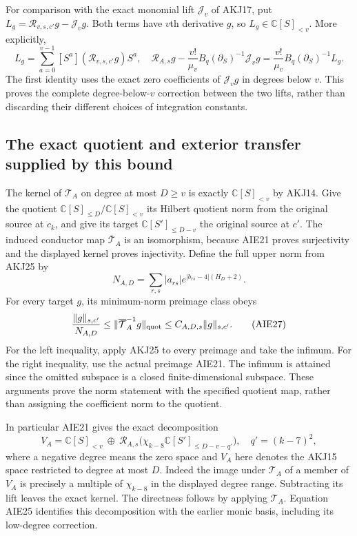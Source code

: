 \documentclass[11pt,a4paper]{article}
\begin{document}
For comparison with the exact monomial lift $\mathcal J_v$ of AKJ17,
put
$L_g=\mathcal R_{v,s,c'}g-\mathcal J_vg$. Both terms have
$v$th derivative $g$, so $L_g\in\mathbb C[S]_{<v}$. More explicitly,
\[
 L_g=\sum_{a=0}^{v-1}
       [S^a](\mathcal R_{v,s,c'}g)S^a,
 \quad
 \mathcal R_{A,s}g-\frac{v!}{\mu_v}B_q(\partial_S)^{-1}\mathcal J_vg
        =\frac{v!}{\mu_v}B_q(\partial_S)^{-1}L_g.
 \tag{AIE25}
\]
The first identity uses the exact zero coefficients of $\mathcal J_vg$
in degrees below $v$. This proves the complete degree-below-$v$
correction between the two lifts, rather than discarding their
different choices of integration constants.

\subsection{The exact quotient and exterior transfer supplied by this bound}

The kernel of $\mathcal T_A$ on degree at most $D\ge v$ is exactly
$\mathbb C[S]_{<v}$ by AKJ14. Give the quotient
$\mathbb C[S]_{\le D}/\mathbb C[S]_{<v}$ its Hilbert quotient norm
from the original source at $c_k$, and give its target
$\mathbb C[S']_{\le D-v}$ the original source at $c'$.
The induced conductor map $\overline{\mathcal T}_A$ is an
isomorphism, because AIE21 proves surjectivity and the displayed
kernel proves injectivity. Define the full upper norm from AKJ25 by
\[
 N_{A,D}=\sum_{r,s}|a_{rs}|
            e^{|b_{rs}-4|(H_D+2)}.
 \tag{AIE26}
\]
For every target $g$, its minimum-norm preimage class obeys
\[
 \frac{\|g\|_{s,c'}}{N_{A,D}}
 \le\|\overline{\mathcal T}_A^{-1}g\|_{\rm quot}
 \le C_{A,D,s}\|g\|_{s,c'}.
 \tag{AIE27}
\]
For the left inequality, apply AKJ25 to every preimage and take the
infimum. For the right inequality, use the actual preimage AIE21.
The infimum is attained since the omitted subspace is a closed
finite-dimensional subspace. These arguments prove the norm statement
with the specified quotient map, rather than assigning the coefficient
norm to the quotient.

In particular AIE21 gives the exact decomposition
\[
 V_A=\mathbb C[S]_{<v}\ \mathbin{\oplus}\
   \mathcal R_{A,s}\bigl(
         \chi_{k-8}\mathbb C[S']_{\le D-v-q'}\bigr),
 \quad q'=(k-7)^2,
 \tag{AIE28}
\]
where a negative degree means the zero space and $V_A$ here denotes
the AKJ15 space restricted to degree at most $D$. Indeed the image
under $\mathcal T_A$ of a member of $V_A$ is precisely a multiple
of $\chi_{k-8}$ in the displayed degree range. Subtracting its lift
leaves the exact kernel. The directness follows by applying
$\mathcal T_A$. Equation AIE25 identifies this decomposition with
the earlier monic basis, including its low-degree correction.
\end{document}
